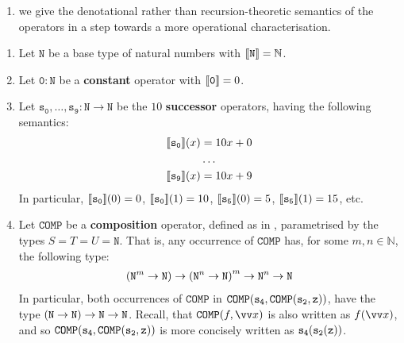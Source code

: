 \begin{enumerate}[label=(\arabic*)]

\item we give the denotational rather than recursion-theoretic semantics of the
operators in a step towards a more operational characterisation.

\end{enumerate}

\def\smashf{\ensuremath{\mathtt{\#}}}
\def\cdotnot{\ensuremath{\cdot}}

\begin{definition} \cite{cobham-1965}

\begin{enumerate}[label=(\arabic*)]

\item Let $\mathtt{N}$ be a base type of natural numbers with ${\mathopen{}\left\llbracket{\mathtt{N}}\right\rrbracket\mathclose{}}
= \mathbb{N}$.

\item Let $\mathtt{0} : \mathtt{N}$ be a \textbf{constant} operator with
${\mathopen{}\left\llbracket{\mathtt{0}}\right\rrbracket\mathclose{}} = 0$.

\item Let $\mathtt{s_0}, \ldots, \mathtt{s_9} : \mathtt{N} \rightarrow
\mathtt{N}$ be the $10$ \textbf{successor} operators, having the following
semantics:\begin{align*}
%
\sem{\mathtt{s_0}}\p{x} &= 10x + 0 \\
%
&\ldots \\
%
\sem{\mathtt{s_9}}\p{x} &= 10x + 9
%
\end{align*} In particular, ${\mathopen{}\left\llbracket{\mathtt{s_0}}\right\rrbracket\mathclose{}}{\mathopen{}\left({0}\right)\mathclose{}} = 0$,
${\mathopen{}\left\llbracket{\mathtt{s_0}}\right\rrbracket\mathclose{}}{\mathopen{}\left({1}\right)\mathclose{}} = 10$, ${\mathopen{}\left\llbracket{\mathtt{s_5}}\right\rrbracket\mathclose{}}{\mathopen{}\left({0}\right)\mathclose{}} = 5$,
${\mathopen{}\left\llbracket{\mathtt{s_5}}\right\rrbracket\mathclose{}}{\mathopen{}\left({1}\right)\mathclose{}} = 15$, etc. 

\item Let $\mathtt{COMP}$ be a \textbf{composition} operator, defined as in
, parametrised by the types $S=T=U=\mathtt{N}$.
That is, any occurrence of $\mathtt{COMP}$ has, for  some $m,n\in\mathbb{N}$,
the following type:\begin{align*}
%
\p{\mathtt{N}^m \rightarrow \mathtt{N}} \rightarrow \p{\mathtt{N}^n \rightarrow
\mathtt{N}}^m \rightarrow \mathtt{N}^n \rightarrow \mathtt{N}
%
\end{align*} In particular, both occurrences of $\mathtt{COMP}$ in
$\mathtt{COMP}{\mathopen{}\left({\mathtt{s_4}, \mathtt{COMP}{\mathopen{}\left({\mathtt{s_2}, \mathtt{z}}\right)\mathclose{}}}\right)\mathclose{}}$,
have the type ${\mathopen{}\left({\mathtt{N} \rightarrow \mathtt{N}}\right)\mathclose{}} \rightarrow \mathtt{N}
\rightarrow \mathtt{N}$. Recall, that $\mathtt{COMP}\p{f,\vect{x}}$ is also
written as $f\p{\vect{x}}$, and so $\mathtt{COMP}{\mathopen{}\left({\mathtt{s_4},
\mathtt{COMP}{\mathopen{}\left({\mathtt{s_2}, \mathtt{z}}\right)\mathclose{}}}\right)\mathclose{}}$ is more concisely written as
$\mathtt{s_4}{\mathopen{}\left({\mathtt{s_2}{\mathopen{}\left({\mathtt{z}}\right)\mathclose{}}}\right)\mathclose{}}$.


\end{enumerate}
\end{definition}

